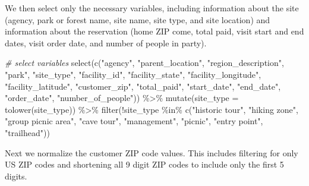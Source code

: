 \documentclass[
  11 pt,
  openany]{book}
\newenvironment{Shaded}{\begin{snugshade}}{\end{snugshade}}
\newcommand{\AttributeTok}[1]{\textcolor[rgb]{0.77,0.63,0.00}{#1}}
\newcommand{\CommentTok}[1]{\textcolor[rgb]{0.56,0.35,0.01}{\textit{#1}}}
\newcommand{\FunctionTok}[1]{\textcolor[rgb]{0.00,0.00,0.00}{#1}}
\newcommand{\NormalTok}[1]{#1}
\newcommand{\SpecialCharTok}[1]{\textcolor[rgb]{0.00,0.00,0.00}{#1}}
\newcommand{\StringTok}[1]{\textcolor[rgb]{0.31,0.60,0.02}{#1}}
\begin{document}
We then select only the necessary variables, including information about the site (agency, park or forest name, site name, site type, and site location) and information about the reservation (home ZIP come, total paid, visit start and end dates, visit order date, and number of people in party).

\begin{Shaded}
\begin{Highlighting}[]
\CommentTok{\# select variables}
\FunctionTok{select}\NormalTok{(}\FunctionTok{c}\NormalTok{(}\StringTok{"agency"}\NormalTok{, }\StringTok{"parent\_location"}\NormalTok{, }\StringTok{"region\_description"}\NormalTok{, }
         \StringTok{"park"}\NormalTok{, }\StringTok{"site\_type"}\NormalTok{, }\StringTok{"facility\_id"}\NormalTok{, }\StringTok{"facility\_state"}\NormalTok{, }
         \StringTok{"facility\_longitude"}\NormalTok{, }\StringTok{"facility\_latitude"}\NormalTok{, }
         \StringTok{"customer\_zip"}\NormalTok{, }\StringTok{"total\_paid"}\NormalTok{, }\StringTok{"start\_date"}\NormalTok{,}
         \StringTok{"end\_date"}\NormalTok{, }\StringTok{"order\_date"}\NormalTok{, }\StringTok{"number\_of\_people"}\NormalTok{)) }\SpecialCharTok{\%\textgreater{}\%}
  \FunctionTok{mutate}\NormalTok{(}\AttributeTok{site\_type =} \FunctionTok{tolower}\NormalTok{(site\_type)) }\SpecialCharTok{\%\textgreater{}\%}
  \FunctionTok{filter}\NormalTok{(}\SpecialCharTok{!}\NormalTok{site\_type }\SpecialCharTok{\%in\%} \FunctionTok{c}\NormalTok{(}\StringTok{"historic tour"}\NormalTok{, }\StringTok{"hiking zone"}\NormalTok{, }
                           \StringTok{"group picnic area"}\NormalTok{, }\StringTok{"cave tour"}\NormalTok{,}
                           \StringTok{"management"}\NormalTok{, }\StringTok{"picnic"}\NormalTok{, }
                           \StringTok{"entry point"}\NormalTok{, }\StringTok{"trailhead"}\NormalTok{))}
\end{Highlighting}
\end{Shaded}

Next we normalize the customer ZIP code values. This includes filtering for only US ZIP codes and shortening all 9 digit ZIP codes to include only the first 5 digits.
\end{document}
